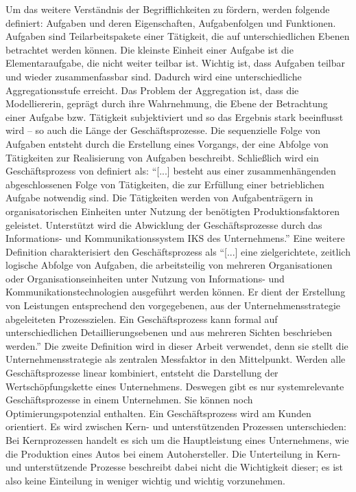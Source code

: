 Um das weitere Verständnis der Begrifflichkeiten zu fördern, werden folgende definiert\autocite[vgl.][S.\,4-5]{staud_geschaftsprozessanalyse_2006}: Aufgaben und deren Eigenschaften, Aufgabenfolgen und Funktionen. Aufgaben sind Teilarbeitspakete einer Tätigkeit, die auf unterschiedlichen Ebenen betrachtet werden können. Die kleinste Einheit einer Aufgabe ist die Elementaraufgabe, die nicht weiter teilbar ist. Wichtig ist, dass Aufgaben teilbar und wieder zusammenfassbar sind. Dadurch wird eine unterschiedliche Aggregationsstufe erreicht. Das Problem der Aggregation ist, dass die Modelliererin, geprägt durch ihre Wahrnehmung, die Ebene der Betrachtung einer Aufgabe bzw. Tätigkeit subjektiviert und so das Ergebnis stark beeinflusst wird -- so auch die Länge der Geschäftsprozesse. Die sequenzielle Folge von Aufgaben entsteht durch die Erstellung eines Vorgangs, der eine Abfolge von Tätigkeiten zur Realisierung von Aufgaben beschreibt. Schließlich wird ein Geschäftsprozess von \cite{staud_geschaftsprozessanalyse_2006} definiert als: \enquote{[...] besteht aus einer zusammenhängenden abgeschlossenen Folge von Tätigkeiten, die zur Erfüllung einer betrieblichen Aufgabe notwendig sind. Die Tätigkeiten werden von Aufgabenträgern in organisatorischen Einheiten unter Nutzung der benötigten Produktionsfaktoren geleistet. Unterstützt wird die Abwicklung der Geschäftsprozesse durch das Informations- und Kommunikationssystem IKS des Unternehmens.}\autocite[][S.\,9]{staud_geschaftsprozessanalyse_2006} Eine weitere Definition charakterisiert den Geschäftsprozess als \enquote{[...] eine zielgerichtete, zeitlich logische Abfolge von Aufgaben, die arbeitsteilig von mehreren Organisationen oder Organisationseinheiten unter Nutzung von Informations- und Kommunikationstechnologien ausgeführt werden können. Er dient der Erstellung von Leistungen entsprechend den vorgegebenen, aus der Unternehmensstrategie abgeleiteten Prozesszielen. Ein Geschäftsprozess kann formal auf unterschiedlichen Detaillierungsebenen und aus mehreren Sichten beschrieben werden.}\autocite[][S.\,41]{gadatsch_grundkurs_2010} Die zweite Definition wird in dieser Arbeit verwendet, denn sie stellt die Unternehmensstrategie als zentralen Messfaktor in den Mittelpunkt. Werden alle Geschäftsprozesse linear kombiniert, entsteht die Darstellung der Wertschöpfungskette eines Unternehmens. Deswegen gibt es nur systemrelevante Geschäftsprozesse in einem Unternehmen. Sie können noch Optimierungspotenzial enthalten. Ein Geschäftsprozess wird am Kunden orientiert. Es wird zwischen Kern- und unterstützenden Prozessen unterschieden: Bei Kernprozessen handelt es sich um die Hauptleistung eines Unternehmens, wie die Produktion eines Autos bei einem Autohersteller. Die Unterteilung in Kern- und unterstützende Prozesse beschreibt dabei nicht die Wichtigkeit dieser; es ist also keine Einteilung in weniger wichtig und wichtig vorzunehmen.\autocite[vgl.][S.\,11]{staud_geschaftsprozessanalyse_2006} \par

